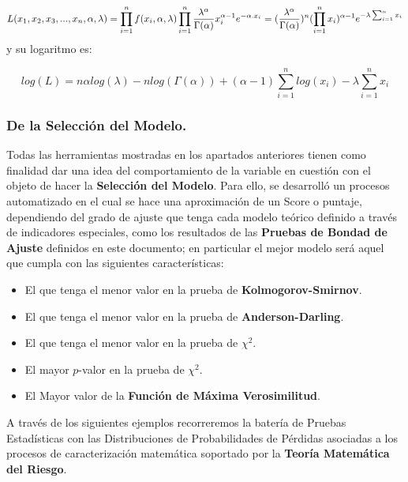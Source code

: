 \documentclass[]{article}
\providecommand{\tightlist}{%
  \setlength{\itemsep}{0pt}\setlength{\parskip}{0pt}}
\begin{document}
\[L(x_1, x_2, x_3, ..., x_n, \alpha, \lambda)=\prod_{i=1}^{n}f(x_i, \alpha, \lambda)\\ \prod_{i=1}^{n}\frac{\lambda^\alpha}{\Gamma(\alpha)}x_i^{\alpha-1}e^{-\alpha.x_i}=(\frac{\lambda^\alpha}{\Gamma(\alpha)})^n (\prod_{i=1}^{n}x_i)^{\alpha-1}e^{-\lambda\sum_{i=1}^{n} x_i} \]
y su logaritmo es:

\[log(L)=n\alpha log(\lambda)-n log(\Gamma(\alpha))+(\alpha-1)\sum_{i=1}^{n}log(x_i)-\lambda\sum_{i=1}^{n}x_i\]

\hypertarget{de-la-seleccion-del-modelo.}{%
\subsubsection{De la Selección del
Modelo.}\label{de-la-seleccion-del-modelo.}}

Todas las herramientas mostradas en los apartados anteriores tienen como
finalidad dar una idea del comportamiento de la variable en cuestión con
el objeto de hacer la \textbf{Selección del Modelo}. Para ello, se
desarrolló un procesos automatizado en el cual se hace una aproximación
de un Score o puntaje, dependiendo del grado de ajuste que tenga cada
modelo teórico definido a través de indicadores especiales, como los
resultados de las \textbf{Pruebas de Bondad de Ajuste} definidos en este
documento; en particular el mejor modelo será aquel que cumpla con las
siguientes características:

\begin{itemize}
\tightlist
\item
  El que tenga el menor valor en la prueba de
  \textbf{Kolmogorov-Smirnov}.\\
\item
  El que tenga el menor valor en la prueba de
  \textbf{Anderson-Darling}.\\
\item
  El que tenga el menor valor en la prueba de \(\chi^2\).\\
\item
  El mayor \(p\)-valor en la prueba de \(\chi^2\).\\
\item
  El Mayor valor de la \textbf{Función de Máxima Verosimilitud}.
\end{itemize}

A través de los siguientes ejemplos recorreremos la batería de Pruebas
Estadísticas con las Distribuciones de Probabilidades de Pérdidas
asociadas a los procesos de caracterización matemática soportado por la
\textbf{Teoría Matemática del Riesgo}.
\end{document}
